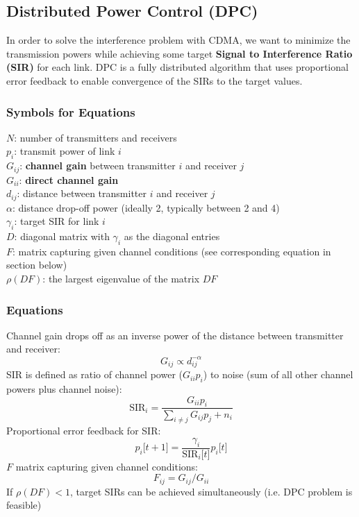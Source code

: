 \documentclass{article}
\newcommand{\MatrixVariable}[1]{\bm{\mathit{#1}}}
\begin{document}
\subsection{Distributed Power Control (DPC)}

In order to solve the interference problem with CDMA, we want to minimize the transmission powers while achieving some target \textbf{Signal to Interference Ratio (SIR)} for each link. DPC is a fully distributed algorithm that uses proportional error feedback to enable convergence of the SIRs to the target values.

\subsubsection{Symbols for Equations}

$N$: number of transmitters and receivers \\
$p_i$: transmit power of link $i$ \\
$G_{ij}$: \textbf{channel gain} between transmitter $i$ and receiver $j$ \\
$G_{ii}$: \textbf{direct channel gain} \\
$d_{ij}$: distance between transmitter $i$ and receiver $j$ \\
$\alpha$: distance drop-off power (ideally 2, typically between 2 and 4) \\
$\gamma_i$: target SIR for link $i$ \\
$\MatrixVariable{D}$: diagonal matrix with $\gamma_i$ as the diagonal entries \\
$\MatrixVariable{F}$: matrix capturing given channel conditions (see corresponding equation in section below) \\
$\rho(\MatrixVariable{DF})$: the largest eigenvalue of the matrix $\MatrixVariable{DF}$

\subsubsection{Equations}

Channel gain drops off as an inverse power of the distance between transmitter and receiver:
$$G_{ij} \propto d_{ij}^{-\alpha}$$
SIR is defined as ratio of channel power ($G_{ii}p_i$) to noise (sum of all other channel powers plus channel noise):
$$\text{SIR}_i = \frac{G_{ii}p_i}{\sum_{i \neq j} G_{ij}p_j + n_i}$$
Proportional error feedback for SIR:
$$p_i\lbrack t+1 \rbrack = \frac{\gamma_i}{\text{SIR}_i \lbrack t \rbrack} p_i \lbrack t \rbrack$$
$\MatrixVariable{F}$ matrix capturing given channel conditions:
$$F_{ij} = G_{ij}/G_{ii}$$
If $\rho(\MatrixVariable{DF}) < 1$, target SIRs can be achieved simultaneously (i.e. DPC problem is feasible)
\end{document}
